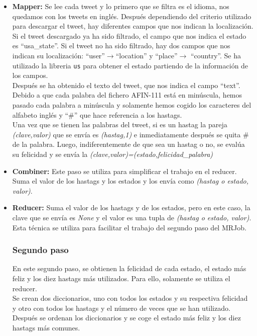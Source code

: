 \documentclass[12pt,a4paper]{article}
\begin{document}
\begin{itemize}
\item \textbf{Mapper:} Se lee cada tweet y lo primero que se filtra es el idioma, nos quedamos con los tweets en inglés. Después dependiendo del criterio utilizado para descargar el tweet, hay diferentes campos que nos indican la localización. Si el tweet descargado ya ha sido filtrado, el campo que nos indica el estado es ``usa\_state''. Si el tweet no ha sido filtrado, hay dos campos que nos indican su localización: ``user''$\rightarrow$``location'' y ``place''$\rightarrow$ ``country''. Se ha utilizado la libreria \texttt{us} para obtener el estado partiendo de la información de los campos.\\

Después se ha obtenido el texto del tweet, que nos indica el campo ``text''. Debido a que cada palabra del fichero AFIN-111 está en minúscula, hemos pasado cada palabra a minúscula y solamente hemos cogido los caracteres del alfabeto inglés y ``\#'' que hace referencia a los hastags.\\

Una vez que se tienen las palabras del tweet, si es un hastag la pareja \textit{(clave,valor)} que se envía es \textit{(hastag,1)} e inmediatamente después se quita $\#$ de la palabra. Luego, indiferentemente de que sea un hastag o no, se evalúa su felicidad y se  envía la \textit{(clave,valor)=(estado,felicidad\_palabra)} 

\item \textbf{Combiner:} Este paso se utiliza para simplificar el trabajo en el reducer. Suma el valor de los hastags y los estados y los envía como \textit{(hastag o estado, valor)}.

\item \textbf{Reducer:} Suma el valor de los hastags y de los estados, pero en este caso, la clave que se envía es \textit{None} y el valor es una tupla de \textit{(hastag o estado, valor)}. Esta técnica se utiliza para facilitar el trabajo del segundo paso del MRJob.

\subsubsection{Segundo paso}

En este segundo paso, se obtienen  la felicidad de cada estado, el estado más feliz y los diez hastags más utilizados. Para ello, solamente se utiliza el reducer.\\

Se crean dos diccionarios, uno con todos los estados y su respectiva felicidad y otro con todos los hastags y el número de   veces que se han utilizado. Después se ordenan los diccionarios y se coge el estado más feliz y los diez hastags más comunes.
\end{itemize}
\end{document}
